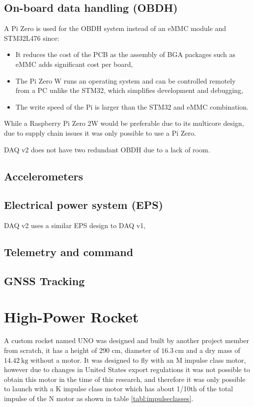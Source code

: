 \documentclass[a4paper,11pt]{article}
\begin{document}
\subsection{On-board data handling (OBDH)}
A Pi Zero is used for the OBDH system instead of an eMMC module and STM32L476 since:
\begin{itemize}
  \item It reduces the cost of the PCB as the assembly of BGA packages such as eMMC adds significant cost per board,
  \item The Pi Zero W runs an operating system and can be controlled remotely from a PC unlike the STM32, which simplifies development and debugging,
  \item The write speed of the Pi is larger than the STM32 and eMMC combination. %
\end{itemize}

While a Raspberry Pi Zero 2W would be preferable due to its multicore design, due to supply chain issues it was only possible to use a Pi Zero.

DAQ v2 does not have two redundant OBDH due to a lack of room.

\subsection{Accelerometers}

\subsection{Electrical power system (EPS)}

DAQ v2 uses a similar EPS design to DAQ v1,

\subsection{Telemetry and command}
\subsection{GNSS Tracking}

\section{High-Power Rocket}

A custom rocket named UNO was designed and built by another project member from scratch, it has a height of 290 cm, diameter of $\SI{16.3}{\centi\metre}$ and a dry mass of $\SI{14.42}{\kilo\gram}$ without a motor. It was designed to fly with an M impulse class motor, however due to changes in United States export regulations it was not possible to obtain this motor in the time of this research, and therefore it was only possible to launch with a K impulse class motor which has about 1/10th of the total impulse of the N motor as shown in table \ref{tabl:impulseclasses}.
\end{document}
